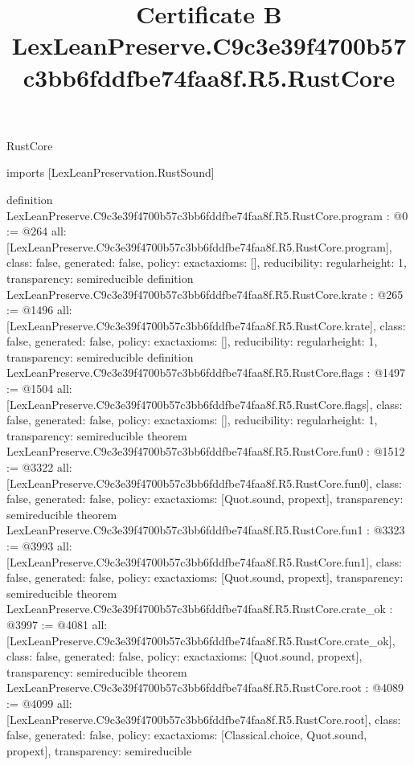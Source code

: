 \begin{lexlean}{RustCore}
\title{Certificate B LexLeanPreserve.C9c3e39f4700b57c3bb6fddfbe74faa8f.R5.RustCore}
\begin{coremodule}
imports [LexLeanPreservation.RustSound]

definition LexLeanPreserve.C9c3e39f4700b57c3bb6fddfbe74faa8f.R5.RustCore.program : @0 := @264 {
  all: [LexLeanPreserve.C9c3e39f4700b57c3bb6fddfbe74faa8f.R5.RustCore.program],
  class: false,
  generated: false,
  policy: exact{axioms: []},
  reducibility: regular{height: 1},
  transparency: semireducible
}
definition LexLeanPreserve.C9c3e39f4700b57c3bb6fddfbe74faa8f.R5.RustCore.krate : @265 := @1496 {
  all: [LexLeanPreserve.C9c3e39f4700b57c3bb6fddfbe74faa8f.R5.RustCore.krate],
  class: false,
  generated: false,
  policy: exact{axioms: []},
  reducibility: regular{height: 1},
  transparency: semireducible
}
definition LexLeanPreserve.C9c3e39f4700b57c3bb6fddfbe74faa8f.R5.RustCore.flags : @1497 := @1504 {
  all: [LexLeanPreserve.C9c3e39f4700b57c3bb6fddfbe74faa8f.R5.RustCore.flags],
  class: false,
  generated: false,
  policy: exact{axioms: []},
  reducibility: regular{height: 1},
  transparency: semireducible
}
theorem LexLeanPreserve.C9c3e39f4700b57c3bb6fddfbe74faa8f.R5.RustCore.fun0 : @1512 := @3322 {
  all: [LexLeanPreserve.C9c3e39f4700b57c3bb6fddfbe74faa8f.R5.RustCore.fun0],
  class: false,
  generated: false,
  policy: exact{axioms: [Quot.sound, propext]},
  transparency: semireducible
}
theorem LexLeanPreserve.C9c3e39f4700b57c3bb6fddfbe74faa8f.R5.RustCore.fun1 : @3323 := @3993 {
  all: [LexLeanPreserve.C9c3e39f4700b57c3bb6fddfbe74faa8f.R5.RustCore.fun1],
  class: false,
  generated: false,
  policy: exact{axioms: [Quot.sound, propext]},
  transparency: semireducible
}
theorem LexLeanPreserve.C9c3e39f4700b57c3bb6fddfbe74faa8f.R5.RustCore.crate_ok : @3997 := @4081 {
  all: [LexLeanPreserve.C9c3e39f4700b57c3bb6fddfbe74faa8f.R5.RustCore.crate_ok],
  class: false,
  generated: false,
  policy: exact{axioms: [Quot.sound, propext]},
  transparency: semireducible
}
theorem LexLeanPreserve.C9c3e39f4700b57c3bb6fddfbe74faa8f.R5.RustCore.root : @4089 := @4099 {
  all: [LexLeanPreserve.C9c3e39f4700b57c3bb6fddfbe74faa8f.R5.RustCore.root],
  class: false,
  generated: false,
  policy: exact{axioms: [Classical.choice, Quot.sound, propext]},
  transparency: semireducible
}


\end{coremodule}
\end{lexlean}
